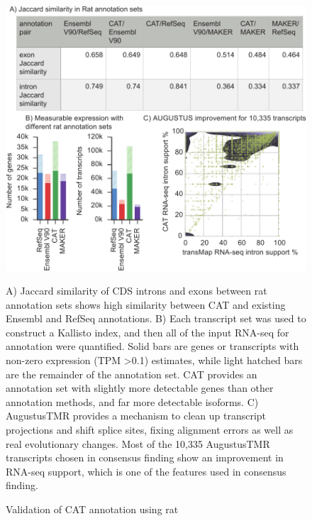 \documentclass[fleqn,10pt]{wlscirep}
\begin{document}
\begin{figure}
\centering
\includegraphics[width=\textwidth,height=\textheight,keepaspectratio]{figure5-rat_v18.pdf}
\caption{Validation of CAT annotation using rat}
A) Jaccard similarity of CDS introns and exons between rat annotation sets shows high similarity between CAT and existing Ensembl and RefSeq annotations. B) Each transcript set was used to construct a Kallisto \cite{bray2015near} index, and then all of the input RNA-seq for annotation were quantified. Solid bars are genes or transcripts with non-zero expression (TPM \textgreater 0.1) estimates, while light hatched bars are the remainder of the annotation set. CAT provides an annotation set with slightly more detectable genes than other annotation methods, and far more detectable isoforms. C) AugustusTMR provides a mechanism to clean up transcript projections and shift splice sites, fixing alignment errors as well as real evolutionary changes. Most of the 10,335 AugustusTMR transcripts chosen in consensus finding show an improvement in RNA-seq support, which is one of the features used in consensus finding.
\label{fig:rat_validation}
\end{figure}
\end{document}
